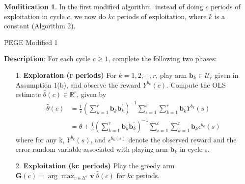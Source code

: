\documentclass{article}
\theoremstyle{plain}
\theoremstyle{definition}
\newtheorem{modification}{Moditication}
\begin{document}

\begin{modification}
In the first modified algorithm, instead of doing $c$ periods of exploitation in cycle $c$, we now do $kc$ periods of exploitation, where $k$ is a constant (Algorithm 2). 
\begin{algorithm}\label{alg:PEGE1}
\caption{PEGE Modified 1}
\textbf{Description}: For each cycle $c\geq 1$, complete the following two phases:
\begin{itemize}
\item [1. ] \textbf{Exploration (r periods)} For $k=1,2,\cdots,r$, play arm $\textbf{b}_{k}\in \mathcal{U}_{r}$ given in Assumption 1(b), and observe the reward $Y^{b_{k}}(c)$. Compute the OLS estimate $\hat{\theta}(c)\in \mathbb{R}^{r}$, given by
\begin{align}
\hat{\theta}(c)&=\frac{1}{c}(\sum_{k=1}^{r}\textbf{b}_{k}\textbf{b}_{k}^{'})^{-1}\sum_{s=1}^{c}\sum_{k=1}^{r}\textbf{b}_{k}Y^{b_{k}}(s) \nonumber \\
&=\theta+\frac{1}{c}(\sum_{k=1}^{r}\textbf{b}_{k}\textbf{b}_{k}^{'})^{-1}\sum_{s=1}^{c}\sum_{k=1}^{r}\textbf{b}_{k}\epsilon^{b_{k}}(s) \nonumber 
\end{align}
where for any k, $Y^{b_{k}}(s)$, and $\epsilon^{b_{k}(s)}$ denote the observed reward and the error random variable associated with playing arm $\textbf{b}_{k}$ in cycle s.
\item [2. ] \textbf{Exploitation ($\bold{kc}$ periods)} Play the greedy arm $\textbf{G}(c)=\arg \max_{v\in \mathcal{U}^{r}}\textbf{v}^{'}\hat{\theta}(c)$ for $kc$ periods.
\end{itemize}
\end{algorithm}

\end{modification}
\end{document}
